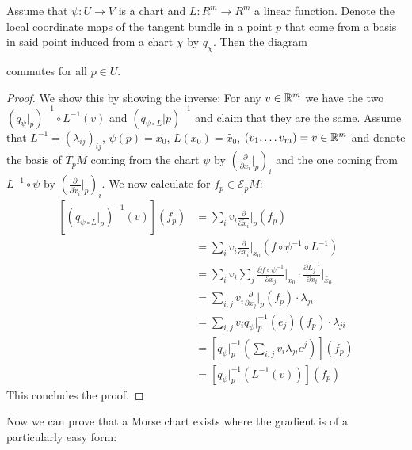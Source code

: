 \begin{lemma} \label{lem:morse-linearChartChangeAndTangendBasisChange}
Assume that $\psi:U\to V$ is a chart and $L:R^m\to R^m$ a linear function. Denote the local coordinate maps of the tangent bundle in a point $p$ that come from a basis in said point induced from a chart $\chi$ by $q_{\chi}$.
Then the diagram \begin{center}
\end{center}  
commutes for all $p\in U$.
\end{lemma}
\begin{proof}
We show this by showing the inverse: For any $v\in \mathbb{R}^m$ we have the two $(q_{\psi} \big|_p)^{-1} \circ  L^{-1}(v)$ and $(q_{\psi \circ L}\big|p)^{-1}$ and claim that they are the same. Assume that $L^{-1}=(\lambda_{ij})_{ij}$, $\psi(p)=x_0$, $L(x_0)=\tilde{x_0}$, $(v_1,\dots v_m)=v\in \mathbb{R}^m$ and denote the basis of $T_pM$ coming from the chart $\psi$ by $\left(\frac{\partial}{\partial x_i}\big|_p \right)_i$ and the one coming from $L^{-1}\circ \psi$ by $\left(\frac{\partial}{\partial \tilde{x}_i}\big|_p \right)_i$. We now calculate for $f_p\in \mathcal{E}_pM$:
\begin{align*}
	\left[(q_{\psi \circ L}\big|_p)^{-1}(v)\right](f_p)
	&= \sum_i v_i \frac{\partial}{\partial \tilde{x}_i}\big|_p (f_p)  \\
	&=\sum_i v_i \frac{\partial}{\partial x_i}\big|_{\tilde{x}_0} (f\circ \psi^{-1}\circ L^{-1}) \\
	&=\sum_{i}v_i \sum_{j} \frac{\partial f\circ \psi^{-1}	}{\partial x_j}\big|_{x_0} \cdot \frac{\partial L^{-1}_j}{\partial x_i}\big|_{\tilde{x_0}}\\
	&= \sum_{i,j}v_i \frac{\partial }{\partial x_j}\big|_{p}(f_p) \cdot \lambda_{ji}\\
	&= \sum_{i,j}v_i q_{\psi}\big|_p^{-1}(e_j)(f_p) \cdot \lambda_{ji}\\
	&= \left[q_{\psi}\big|_p^{-1}(\sum_{i,j} v_i \lambda_{ji} e^j)\right](f_p)\\
	&= \left[q_{\psi}\big|_p^{-1}(L^{-1}(v))\right](f_p)
\end{align*}
This concludes the proof.
\end{proof}

Now we can prove that a Morse chart exists where the gradient is of a particularly easy form:


